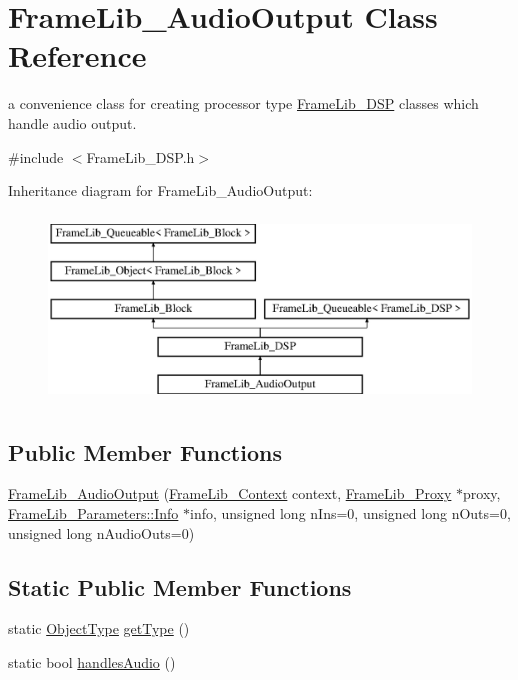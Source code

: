 \hypertarget{class_frame_lib___audio_output}{}\section{Frame\+Lib\+\_\+\+Audio\+Output Class Reference}
\label{class_frame_lib___audio_output}


a convenience class for creating processor type \hyperlink{class_frame_lib___d_s_p}{Frame\+Lib\+\_\+\+D\+SP} classes which handle audio output.  




{\ttfamily \#include $<$Frame\+Lib\+\_\+\+D\+S\+P.\+h$>$}

Inheritance diagram for Frame\+Lib\+\_\+\+Audio\+Output\+:\begin{figure}[H]
\begin{center}
\leavevmode
\includegraphics[height=5.000000cm]{class_frame_lib___audio_output}
\end{center}
\end{figure}
\subsection*{Public Member Functions}
\begin{DoxyCompactItemize}
\item 
\hyperlink{class_frame_lib___audio_output_a5bbfeb85ab62136e67e147e65e6b78f5}{Frame\+Lib\+\_\+\+Audio\+Output} (\hyperlink{class_frame_lib___context}{Frame\+Lib\+\_\+\+Context} context, \hyperlink{struct_frame_lib___proxy}{Frame\+Lib\+\_\+\+Proxy} $\ast$proxy, \hyperlink{class_frame_lib___parameters_1_1_info}{Frame\+Lib\+\_\+\+Parameters\+::\+Info} $\ast$info, unsigned long n\+Ins=0, unsigned long n\+Outs=0, unsigned long n\+Audio\+Outs=0)
\end{DoxyCompactItemize}
\subsection*{Static Public Member Functions}
\begin{DoxyCompactItemize}
\item 
static \hyperlink{_frame_lib___types_8h_a842c5e2e69277690b064bf363c017980}{Object\+Type} \hyperlink{class_frame_lib___audio_output_a99908793774ac5046c3e369bc9a19259}{get\+Type} ()
\item 
static bool \hyperlink{class_frame_lib___audio_output_a394659d38e6e48418faf75bbae4cbc01}{handles\+Audio} ()
\end{DoxyCompactItemize}
